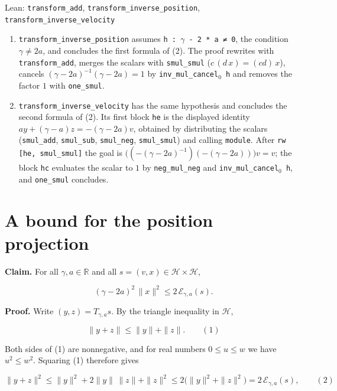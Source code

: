 \documentclass[11pt,a4paper]{article}
\begin{document}
\begin{leanbox}{Lean: \texttt{transform\_\allowbreak{}add}, \texttt{transform\_\allowbreak{}inverse\_\allowbreak{}position}, \texttt{transform\_\allowbreak{}inverse\_\allowbreak{}velocity}}
\begin{enumerate}
\item \texttt{transform\_\allowbreak{}inverse\_\allowbreak{}position} assumes \texttt{h : \ensuremath{\gamma} -\allowbreak{} 2 * a ≠ 0}, the condition \(\gamma\neq2a\), and concludes the first formula of (2). The proof rewrites with \texttt{transform\_\allowbreak{}add}, merges the scalars with \texttt{smul\_\allowbreak{}smul} (\(c\,(d\,x)=(cd)\,x\)), cancels \((\gamma-2a)^{-1}(\gamma-2a)=1\) by \texttt{inv\_\allowbreak{}mul\_\allowbreak{}cancel\ensuremath{{}_{0}} h} and removes the factor \(1\) with \texttt{one\_\allowbreak{}smul}.

\item \texttt{transform\_\allowbreak{}inverse\_\allowbreak{}velocity} has the same hypothesis and concludes the second formula of (2). Its first block \texttt{he} is the displayed identity \(ay+(\gamma-a)z=-(\gamma-2a)v\), obtained by distributing the scalars (\texttt{smul\_\allowbreak{}add}, \texttt{smul\_\allowbreak{}sub}, \texttt{smul\_\allowbreak{}neg}, \texttt{smul\_\allowbreak{}smul}) and calling \texttt{module}. After \texttt{rw [he, smul\_\allowbreak{}smul]} the goal is \(\bigl((-(\gamma-2a)^{-1})(-(\gamma-2a))\bigr)v=v\); the block \texttt{hc} evaluates the scalar to \(1\) by \texttt{neg\_\allowbreak{}mul\_\allowbreak{}neg} and \texttt{inv\_\allowbreak{}mul\_\allowbreak{}cancel\ensuremath{{}_{0}} h}, and \texttt{one\_\allowbreak{}smul} concludes.

\end{enumerate}
\end{leanbox}

\section{\texorpdfstring{A bound for the position projection}{A bound for the position projection}}


\textbf{Claim.} For all \(\gamma,a\in\mathbb R\) and all \(s=(v,x)\in \mathcal H\times \mathcal H\),


\[(\gamma-2a)^2\,\|x\|^2\le2\,\mathcal E_{\gamma,a}(s).\]


\textbf{Proof.} Write \((y,z)=T_{\gamma,a}s\). By the triangle inequality in \(\mathcal H\),


\[\|y+z\|\le\|y\|+\|z\|.\qquad(1)\]


Both sides of (1) are nonnegative, and for real numbers \(0\le u\le w\) we have \(u^2\le w^2\). Squaring (1) therefore gives


\[\|y+z\|^2\le\|y\|^2+2\|y\|\,\|z\|+\|z\|^2\le2\bigl(\|y\|^2+\|z\|^2\bigr)=2\,\mathcal E_{\gamma,a}(s),\qquad(2)\]
\end{document}
